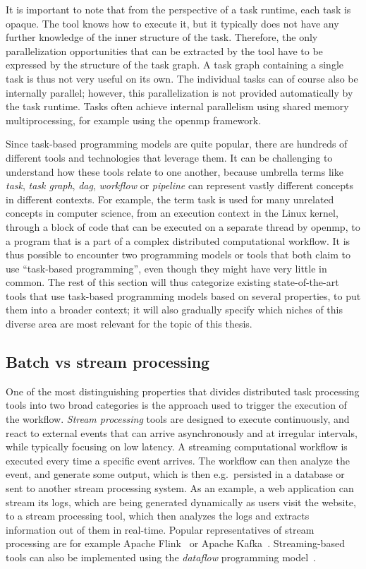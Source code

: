 It is important to note that from the perspective of a task runtime, each task is opaque. The tool
knows how to execute it, but it typically does not have any further knowledge of the inner
structure of the task. Therefore, the only parallelization opportunities that can be extracted by
the tool have to be expressed by the structure of the task graph. A task graph containing a single
task is thus not very useful on its own. The individual tasks can of course also be internally
parallel; however, this parallelization is not provided automatically by the task runtime. Tasks
often achieve internal parallelism using shared memory multiprocessing, for example using the
\gls{openmp} framework.

Since task-based programming models are quite popular, there are hundreds of different tools and
technologies that leverage them. It can be challenging to understand how these tools relate to one
another, because umbrella terms like \emph{task}, \emph{task graph},
\emph{\gls{dag}}, \emph{workflow} or \emph{pipeline} can represent vastly
different concepts in different contexts. For example, the term task is used for many unrelated
concepts in computer science, from an execution context in the Linux kernel, through a block of
code that can be executed on a separate thread by \gls{openmp}, to a program that is a
part of a complex distributed computational workflow. It is thus possible to encounter two
programming models or tools that both claim to use ``task-based programming'', even though they
might have very little in common. The rest of this section will thus categorize existing
state-of-the-art tools that use task-based programming models based on several properties, to put
them into a broader context; it will also gradually specify which niches of this diverse area are
most relevant for the topic of this thesis.

\subsection{Batch vs stream processing}
One of the most distinguishing properties that divides distributed task processing tools into two
broad categories is the approach used to trigger the execution of the workflow.
\emph{Stream processing} tools are designed to execute continuously, and react to external events
that can arrive asynchronously and at irregular intervals, while typically focusing on low latency.
A streaming computational workflow is executed every time a specific event arrives. The workflow
can then analyze the event, and generate some output, which is then e.g.\ persisted in a database
or sent to another stream processing system. As an example, a web application can stream its logs,
which are being generated dynamically as users visit the website, to a stream processing tool,
which then analyzes the logs and extracts information out of them in real-time. Popular
representatives of stream processing are for example Apache Flink~\cite{flink} or Apache
Kafka~\cite{kafka}. Streaming-based tools can also be implemented using the
\emph{dataflow} programming model~\cite{dataflow,timely_dataflow}.

